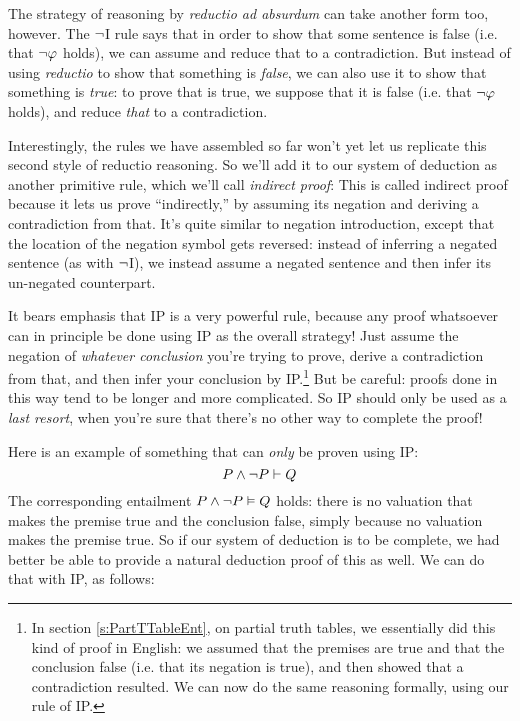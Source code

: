 The strategy of reasoning by \emph{reductio ad absurdum} can take another form too, however. The $\neg$I rule says that in order to show that some sentence \meta{\varphi} is false (i.e. that $\neg \mathcal{\varphi}$ holds), we can assume \meta{\varphi} and reduce that to a contradiction.  But instead of using \emph{reductio} to show that something is \emph{false}, we can also use it to show that something is \emph{true}: to prove that \meta{\varphi} is true, we suppose that it is false (i.e. that $\neg \mathcal{\varphi}$ holds), and reduce \emph{that} to a contradiction.



Interestingly, the rules we have assembled so far won't yet let us replicate this second style of reductio reasoning.  So we'll add it to our system of deduction as another primitive rule, which we'll call \emph{indirect proof}:
This is called indirect proof because it lets us prove \meta{\varphi} ``indirectly,'' by assuming its negation and deriving a contradiction from that. It's quite similar to negation introduction, except that the location of the negation symbol gets reversed: instead of inferring a negated sentence (as with $\neg$I), we instead assume a negated sentence and then infer its un-negated counterpart.

It bears emphasis that IP is a very powerful rule, because any proof whatsoever can in principle be done using IP as the overall strategy!  Just assume the negation of \emph{whatever conclusion} you're trying to prove, derive a contradiction from that, and then infer your conclusion by IP.\footnote{In section \ref{s:PartTTableEnt}, on partial truth tables, we essentially did this kind of proof in English: we assumed that the premises are true and  that the conclusion false (i.e. that its negation  is true), and then showed that a contradiction resulted.  We can now do the same reasoning formally, using our rule of IP.}  But be careful: proofs done in this way tend to be longer and more complicated.  So IP should only be used as a \emph{last resort}, when you're sure that there's no other way to complete the proof!

Here is an example of something that can \emph{only} be proven using IP:
$$P \wedge \neg P \vdash Q$$
The corresponding entailment $P \wedge \neg P \vDash Q$ holds: there is no valuation that makes the premise true and the conclusion false, simply because no valuation makes the premise true.  So if our system of deduction is to be complete, we had better be able to provide a natural deduction proof of this as well.  We can do that with IP, as follows:\\

